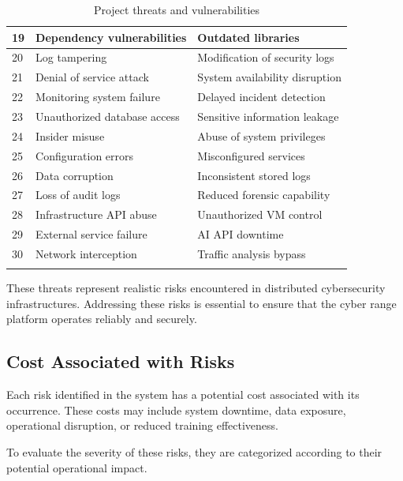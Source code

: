 \begin{longtable}{|p{}|p{}|p{}|}
        \hline
        19 & Dependency vulnerabilities & Outdated libraries \\
        \hline
        20 & Log tampering & Modification of security logs \\
        \hline
        21 & Denial of service attack & System availability disruption \\
        \hline
        22 & Monitoring system failure & Delayed incident detection \\
        \hline
        23 & Unauthorized database access & Sensitive information leakage \\
        \hline
        24 & Insider misuse & Abuse of system privileges \\
        \hline
        25 & Configuration errors & Misconfigured services \\
        \hline
        26 & Data corruption & Inconsistent stored logs \\
        \hline
        27 & Loss of audit logs & Reduced forensic capability \\
        \hline
        28 & Infrastructure API abuse & Unauthorized VM control \\
        \hline
        29 & External service failure & AI API downtime \\
        \hline
        30 & Network interception & Traffic analysis bypass \\
        \hline
    \caption{Project threats and vulnerabilities} \\
\end{longtable}
\vspace{\baselineskip}

These threats represent realistic risks encountered in distributed cybersecurity infrastructures. Addressing these risks is essential to ensure that the cyber range platform operates reliably and securely.

\subsection{Cost Associated with Risks}
Each risk identified in the system has a potential cost associated with its occurrence. These costs may include system downtime, data exposure, operational disruption, or reduced training effectiveness.

To evaluate the severity of these risks, they are categorized according to their potential operational impact.

